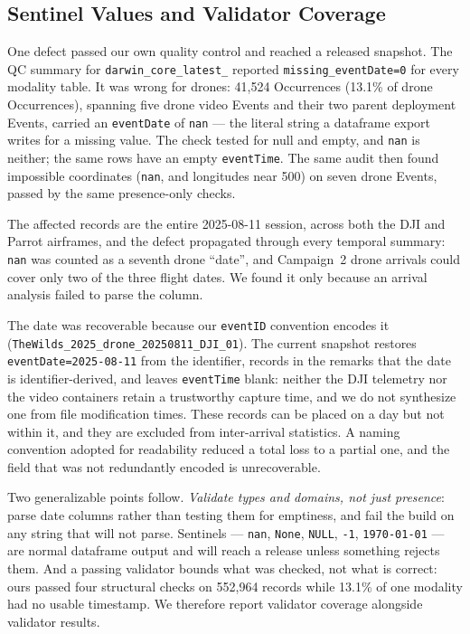 \documentclass[sigconf]{acmart}
\begin{document}
\subsection{Sentinel Values and Validator Coverage}
\label{sec:nulldefect}

One defect passed our own quality control and reached a released
snapshot. The QC summary for \texttt{darwin\_core\_\allowbreak latest\_}
reported \texttt{missing\_\allowbreak eventDate=0} for every modality
table. It was wrong for drones: 41{,}524 Occurrences (13.1\% of drone
Occurrences), spanning five drone video Events and their two parent
deployment Events, carried an \texttt{eventDate} of \texttt{nan} --- the
literal string a dataframe export writes for a missing value. The check
tested for null and empty, and \texttt{nan} is neither; the same rows
have an empty \texttt{eventTime}. The same audit then found impossible
coordinates (\texttt{nan}, and longitudes near 500) on seven drone
Events, passed by the same presence-only checks.

The affected records are the entire 2025-08-11 session, across both the
DJI and Parrot airframes, and the defect propagated through every
temporal summary: \texttt{nan} was counted as a seventh drone ``date'',
and Campaign~2 drone arrivals could cover only two of the three flight
dates. We found it only because an arrival analysis failed to parse the
column.

The date was recoverable because our \texttt{eventID} convention encodes
it (\texttt{TheWilds\_2025\_drone\_20250811\_DJI\_01}). The current
snapshot restores \texttt{eventDate=2025-08-11} from the identifier,
records in the remarks that the date is identifier-derived, and leaves
\texttt{eventTime} blank: neither the DJI telemetry nor the video
containers retain a trustworthy capture time, and we do not synthesize
one from file modification times. These records can be placed on a day
but not within it, and they are excluded from inter-arrival
statistics. A naming convention adopted for readability reduced a total
loss to a partial one, and the field that was not redundantly encoded is
unrecoverable.

Two generalizable points follow. \emph{Validate types and domains, not
just presence}: parse date columns rather than testing them for
emptiness, and fail the build on any string that will not parse.
Sentinels --- \texttt{nan}, \texttt{None}, \texttt{NULL}, \texttt{-1},
\texttt{1970-01-01} --- are normal dataframe output and will reach a
release unless something rejects them. And a passing validator bounds
what was checked, not what is correct: ours passed four structural checks
on 552{,}964 records while 13.1\% of one modality had no usable
timestamp. We therefore report validator coverage alongside validator
results.
\end{document}

